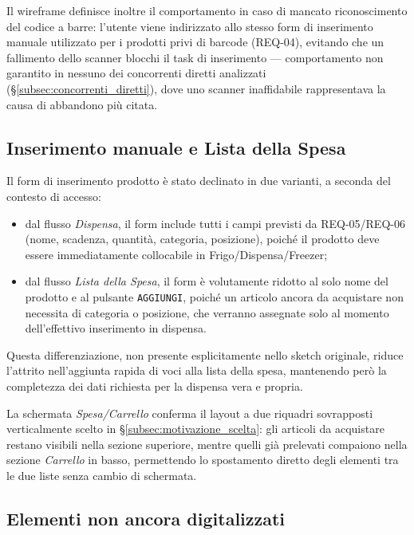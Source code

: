 \documentclass[11pt,a4paper]{article}
\begin{document}
Il wireframe definisce inoltre il comportamento in caso di mancato riconoscimento del codice a barre: l'utente viene indirizzato allo stesso
form di inserimento manuale utilizzato per i prodotti privi di barcode (REQ-04), evitando che un fallimento dello scanner blocchi il task di
inserimento --- comportamento non garantito in nessuno dei concorrenti diretti analizzati (\S\ref{subsec:concorrenti_diretti}), dove uno scanner inaffidabile rappresentava
la causa di abbandono più citata.

\subsection{Inserimento manuale e Lista della Spesa}

Il form di inserimento prodotto è stato declinato in due varianti, a seconda del contesto di accesso:

\begin{itemize}
    \item dal flusso \emph{Dispensa}, il form include tutti i campi previsti da REQ-05/REQ-06 (nome, scadenza, quantità, categoria, posizione),
    poiché il prodotto deve essere immediatamente collocabile in Frigo/Dispensa/Freezer;
    \item dal flusso \emph{Lista della Spesa}, il form è volutamente ridotto al solo nome del prodotto e al pulsante \texttt{AGGIUNGI},
    poiché un articolo ancora da acquistare non necessita di categoria o posizione, che verranno assegnate solo al momento dell'effettivo
    inserimento in dispensa.
\end{itemize}

Questa differenziazione, non presente esplicitamente nello sketch originale, riduce l'attrito nell'aggiunta rapida di voci alla lista della
spesa, mantenendo però la completezza dei dati richiesta per la dispensa vera e propria.

La schermata \emph{Spesa/Carrello} conferma il layout a due riquadri sovrapposti verticalmente scelto in \S\ref{subsec:motivazione_scelta}: gli articoli da acquistare
restano visibili nella sezione superiore, mentre quelli già prelevati compaiono nella sezione \emph{Carrello} in basso, permettendo lo
spostamento diretto degli elementi tra le due liste senza cambio di schermata.

\subsection{Elementi non ancora digitalizzati}
\end{document}

